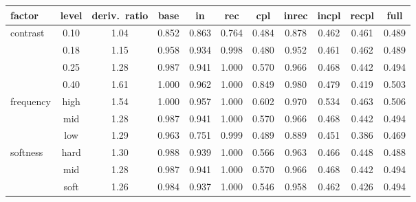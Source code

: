 \setlength{\tabcolsep}{3pt}
\begin{tabular}{@{}lcccccccccc@{}}
\toprule
factor & level & deriv.\ ratio & base & in & rec & cpl & inrec & incpl & recpl & full \\
\midrule
contrast & 0.10 & 1.04 & 0.852 & 0.863 & 0.764 & 0.484 & 0.878 & 0.462 & 0.461 & 0.489 \\
 & 0.18 & 1.15 & 0.958 & 0.934 & 0.998 & 0.480 & 0.952 & 0.461 & 0.462 & 0.489 \\
 & 0.25 & 1.28 & 0.987 & 0.941 & 1.000 & 0.570 & 0.966 & 0.468 & 0.442 & 0.494 \\
 & 0.40 & 1.61 & 1.000 & 0.962 & 1.000 & 0.849 & 0.980 & 0.479 & 0.419 & 0.503 \\
frequency & high & 1.54 & 1.000 & 0.957 & 1.000 & 0.602 & 0.970 & 0.534 & 0.463 & 0.506 \\
 & mid & 1.28 & 0.987 & 0.941 & 1.000 & 0.570 & 0.966 & 0.468 & 0.442 & 0.494 \\
 & low & 1.29 & 0.963 & 0.751 & 0.999 & 0.489 & 0.889 & 0.451 & 0.386 & 0.469 \\
softness & hard & 1.30 & 0.988 & 0.939 & 1.000 & 0.566 & 0.963 & 0.466 & 0.448 & 0.488 \\
 & mid & 1.28 & 0.987 & 0.941 & 1.000 & 0.570 & 0.966 & 0.468 & 0.442 & 0.494 \\
 & soft & 1.26 & 0.984 & 0.937 & 1.000 & 0.546 & 0.958 & 0.462 & 0.426 & 0.494 \\
\bottomrule
\end{tabular}
